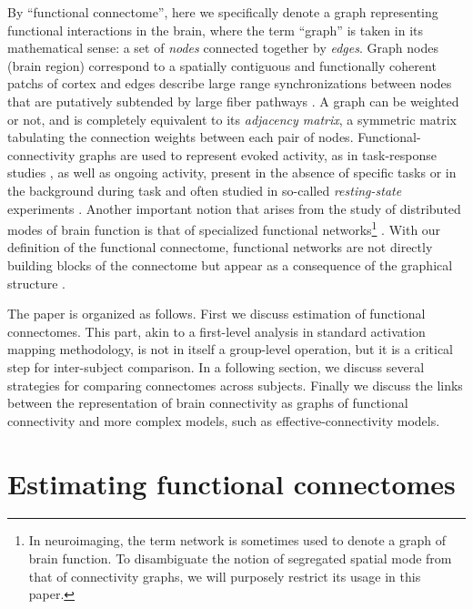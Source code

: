 \documentclass[5p]{elsarticle}
\begin{document}
By ``functional connectome'', here we specifically denote a graph representing
functional interactions in the brain, where the term ``graph'' is taken in its
mathematical sense: a set of \emph{nodes} connected together by \emph{edges}.
Graph nodes (brain region) correspond to a spatially contiguous and functionally
coherent patchs of cortex and edges describe large range synchronizations between nodes
that are putatively subtended by large fiber pathways \cite{marrelec2006}.  A
graph can be weighted or not, and is completely equivalent to its
\emph{adjacency matrix}, a symmetric matrix tabulating the connection weights
between each pair of nodes.  Functional-connectivity graphs are used to
represent evoked activity, as in task-response studies \cite{mcintosh2000}, as
well as ongoing activity, present in the absence of specific tasks or in the
background during task and often studied in so-called \emph{resting-state}
experiments \cite{raichle2010}. Another important notion that arises from the
study of distributed modes of brain function is that of specialized functional
networks\footnote{In neuroimaging, the term network is sometimes used to denote
	a graph of brain function. To disambiguate the notion of segregated
	spatial mode \cite{fox2005} from that of connectivity graphs, we will
	purposely restrict its usage in this paper.} \cite{fox2005}. With our
definition of the functional connectome, functional networks are not directly
building blocks of the connectome but appear as a consequence of the graphical
structure \cite{varoquaux2010c,varoquaux2012}.

The paper is organized as follows. First we discuss estimation of functional
connectomes. This part, akin to a first-level analysis in standard activation
mapping methodology, is not in itself a group-level operation, but it is a
critical step for inter-subject comparison.  In a following section, we discuss
several strategies for comparing connectomes across subjects. Finally we discuss
the links between the representation of brain connectivity as graphs of
functional connectivity and more complex models, such as effective-connectivity
models.



\section{Estimating functional connectomes}
\end{document}
